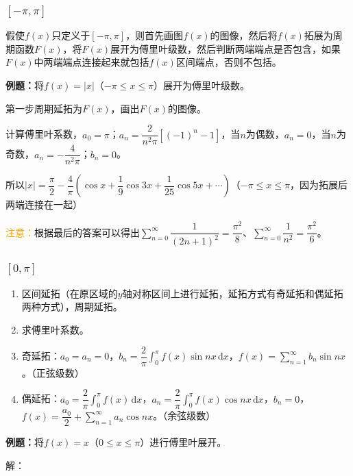 \documentclass[UTF8, 12pt]{ctexart}
\begin{document}
        \subsubsection{\texorpdfstring{$[-\pi,\pi]$}n}

        假使$f(x)$只定义于$[-\pi,\pi]$，则首先画图$f(x)$的图像，然后将$f(x)$拓展为周期函数$F(x)$，将$F(x)$展开为傅里叶级数，然后判断两端端点是否包含，如果$F(x)$中两端端点连接起来就包括$f(x)$区间端点，否则不包括。

        \textbf{例题：}将$f(x)=\vert x\vert$（$-\pi\leqslant x\leqslant\pi$）展开为傅里叶级数。

        第一步周期延拓为$F(x)$，画出$F(x)$的图像。

        计算傅里叶系数，$a_0=\pi$；$a_n=\dfrac{2}{n^2\pi}[(-1)^n-1]$，当$n$为偶数，$a_n=0$，当$n$为奇数，$a_n=-\dfrac{4}{n^2\pi}$；$b_n=0$。

        所以$\vert x\vert=\dfrac{\pi}{2}-\dfrac{4}{\pi}(\cos x+\dfrac{1}{9}\cos3x+\dfrac{1}{25}\cos5x+\cdots)$（$-\pi\leqslant x\leqslant\pi$，因为拓展后两端连接在一起）

        \textcolor{orange}{注意：}根据最后的答案可以得出$\sum\limits_{n=0}^\infty\dfrac{1}{(2n+1)^2}=\dfrac{\pi^2}{8}$、$\sum\limits_{n=0}^\infty\dfrac{1}{n^2}=\dfrac{\pi^2}{6}$。

        \subsubsection{\texorpdfstring{$[0,\pi]$}n}

        \begin{enumerate}
            \item 区间延拓（在原区域的$y$轴对称区间上进行延拓，延拓方式有奇延拓和偶延拓两种方式），周期延拓。
            \item 求傅里叶系数。
            \item 奇延拓：$a_0=a_n=0$，$b_n=\dfrac{2}{\pi}\int_0^\pi f(x)\sin nx\,\textrm{d}x$，$f(x)=\sum\limits_{n=1}^\infty b_n\sin nx$。（正弦级数）
            \item 偶延拓：$a_0=\dfrac{2}{\pi}\int_0^\pi f(x)\,\textrm{d}x$，$a_n=\dfrac{2}{\pi}\int_0^\pi f(x)\cos nx\,\textrm{d}x$，$b_n=0$，$f(x)=\dfrac{a_0}{2}+\sum\limits_{n=1}^\infty a_n\cos nx$。（余弦级数）
        \end{enumerate}

        \textbf{例题：}将$f(x)=x$（$0\leqslant x\leqslant\pi$）进行傅里叶展开。

        解：
\end{document}
